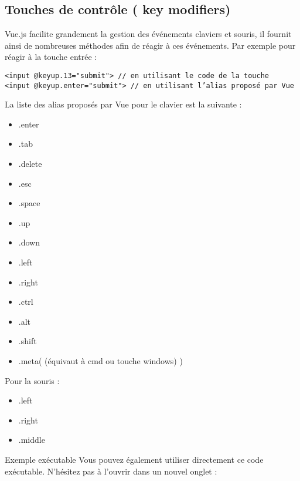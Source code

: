 \subsection{Touches de contrôle ( {\color{monOrange}key modifiers})}
{\color{monOrange}Vue.js} facilite grandement la gestion des événements claviers et souris, il fournit ainsi de nombreuses méthodes afin de réagir à ces événements. Par exemple pour réagir à la touche entrée :
\begin{verbatim}
<input @keyup.13="submit"> // en utilisant le code de la touche
<input @keyup.enter="submit"> // en utilisant l’alias proposé par Vue
\end{verbatim}
La liste des alias proposés par Vue pour le clavier est la suivante :
\begin{itemize}
\item {\color{blue} .enter}
\item {\color{blue} .tab}
\item {\color{blue} .delete}
\item {\color{blue} .esc}
\item {\color{blue} .space}
\item {\color{blue} .up}
\item {\color{blue} .down}
\item {\color{blue} .left}
\item {\color{blue} .right}
\item {\color{blue} .ctrl}
\item {\color{blue} .alt}
\item {\color{blue} .shift}
\item {\color{blue} .meta}( (équivaut à cmd ou touche windows) )
\end{itemize}
Pour la souris :
\begin{itemize}
\item {\color{blue} .left}
\item {\color{blue}.right}
\item {\color{blue}.middle}
\end{itemize}
Exemple exécutable
Vous pouvez également utiliser directement ce code exécutable. N'hésitez pas à l'ouvrir dans un nouvel onglet :


